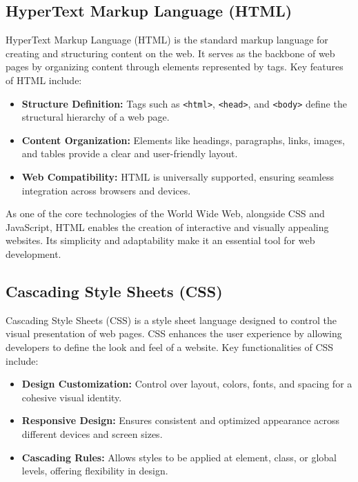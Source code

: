 \subsection{HyperText Markup Language (HTML)}

HyperText Markup Language (HTML) is the standard markup language for creating and structuring content on the web. It serves as the backbone of web pages by organizing content through elements represented by tags. Key features of HTML include:

\begin{itemize}
    \item \textbf{Structure Definition:} Tags such as \texttt{<html>}, \texttt{<head>}, and \texttt{<body>} define the structural hierarchy of a web page.
    \item \textbf{Content Organization:} Elements like headings, paragraphs, links, images, and tables provide a clear and user-friendly layout.
    \item \textbf{Web Compatibility:} HTML is universally supported, ensuring seamless integration across browsers and devices.
\end{itemize}

As one of the core technologies of the World Wide Web, alongside CSS and JavaScript, HTML enables the creation of interactive and visually appealing websites. Its simplicity and adaptability make it an essential tool for web development.

\cite{HTML-Wikipedia}

\subsection{Cascading Style Sheets (CSS)}

Cascading Style Sheets (CSS) is a style sheet language designed to control the visual presentation of web pages. CSS enhances the user experience by allowing developers to define the look and feel of a website. Key functionalities of CSS include:

\begin{itemize}
    \item \textbf{Design Customization:} Control over layout, colors, fonts, and spacing for a cohesive visual identity.
    \item \textbf{Responsive Design:} Ensures consistent and optimized appearance across different devices and screen sizes.
    \item \textbf{Cascading Rules:} Allows styles to be applied at element, class, or global levels, offering flexibility in design.
\end{itemize}

